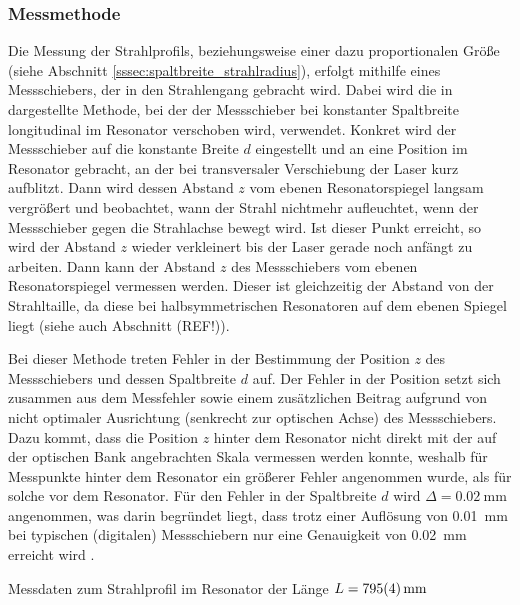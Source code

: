 \documentclass[11pt, a4paper]{article}
\numberwithin{equation}{section}
\begin{document}
\subsubsection{Messmethode}
Die Messung der Strahlprofils, beziehungsweise einer dazu proportionalen Größe (siehe Abschnitt \ref{sssec:spaltbreite_strahlradius}), erfolgt mithilfe eines Messschiebers, der in den Strahlengang gebracht wird.
Dabei wird die in \cite{anleitung} dargestellte Methode, bei der der Messschieber bei konstanter Spaltbreite longitudinal im Resonator verschoben wird, verwendet.
Konkret wird der Messschieber auf die konstante Breite $d$ eingestellt und an eine Position im Resonator gebracht, an der bei transversaler Verschiebung der Laser kurz aufblitzt.
Dann wird dessen Abstand $z$ vom ebenen Resonatorspiegel langsam vergrößert und beobachtet, wann der Strahl nichtmehr aufleuchtet, wenn der Messschieber gegen die Strahlachse bewegt wird.
Ist dieser Punkt erreicht, so wird der Abstand $z$ wieder verkleinert bis der Laser gerade noch anfängt zu arbeiten.
Dann kann der Abstand $z$ des Messschiebers vom ebenen Resonatorspiegel vermessen werden.
Dieser ist gleichzeitig der Abstand von der Strahltaille, da diese bei halbsymmetrischen Resonatoren auf dem ebenen Spiegel liegt (siehe auch Abschnitt (REF!)).

Bei dieser Methode treten Fehler in der Bestimmung der Position $z$ des Messschiebers und dessen Spaltbreite $d$ auf.
Der Fehler in der Position setzt sich zusammen aus dem Messfehler sowie einem zusätzlichen Beitrag aufgrund von nicht optimaler Ausrichtung (senkrecht zur optischen Achse) des Messschiebers.
Dazu kommt, dass die Position $z$ hinter dem Resonator nicht direkt mit der auf der optischen Bank angebrachten Skala vermessen werden konnte, weshalb für Messpunkte hinter dem Resonator ein größerer Fehler angenommen wurde, als für solche vor dem Resonator.
Für den Fehler in der Spaltbreite $d$ wird $\Delta = \SI{0.02}{\milli\metre}$ angenommen, was darin begründet liegt, dass trotz einer Auflösung von \SI{0.01}{\milli\metre} bei typischen (digitalen) Messschiebern nur eine Genauigkeit von \SI{0.02}{\milli\metre} erreicht wird \cite{messschieber_katalog}.
\begin{table}[h]
	\centering
	
	\caption{Messdaten zum Strahlprofil im Resonator der Länge $L = \SI{795 +- 4}{\milli\metre}$}
	\label{tab:ex_messdaten_strahlprofil}
\end{table}
\end{document}

